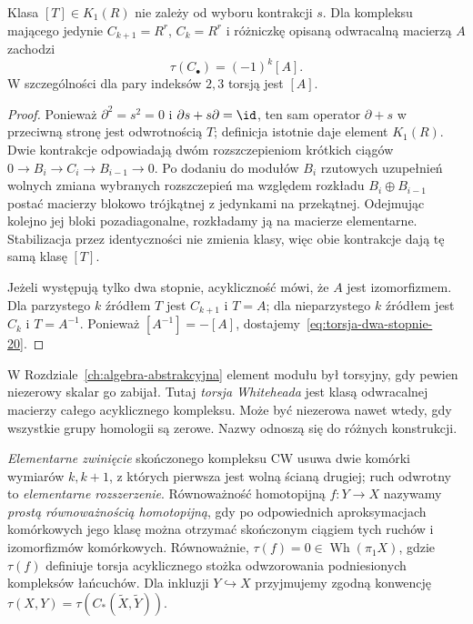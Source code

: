 \begin{stwierdzenie}
\label{prop:torsja-poprawna-20}
Klasa $[T]\in K_1(R)$ nie zależy od wyboru
kontrakcji $s$. Dla kompleksu mającego jedynie
$C_{k+1}=R^r$, $C_k=R^r$ i różniczkę opisaną
odwracalną macierzą $A$ zachodzi
\begin{equation}\label{eq:torsja-dwa-stopnie-20}
 \tau(C_\bullet)=(-1)^k[A].
\end{equation}
W szczególności dla pary indeksów $2,3$ torsją
jest $[A]$.
\end{stwierdzenie}
\begin{proof}
Ponieważ $\partial^2=s^2=0$ i
$\partial s+s\partial=\id$, ten sam operator
$\partial+s$ w przeciwną stronę jest odwrotnością
$T$; definicja istotnie daje element $K_1(R)$.
Dwie kontrakcje odpowiadają dwóm rozszczepieniom
krótkich ciągów $0\to B_i\to C_i\to B_{i-1}\to0$.
Po dodaniu do modułów $B_i$ rzutowych
uzupełnień wolnych zmiana wybranych rozszczepień
ma względem rozkładu $B_i\oplus B_{i-1}$ postać
macierzy blokowo trójkątnej z jedynkami na przekątnej.
Odejmując kolejno jej bloki pozadiagonalne,
rozkładamy ją na macierze elementarne.
Stabilizacja przez identyczności nie zmienia klasy,
więc obie kontrakcje dają tę samą klasę $[T]$.

Jeżeli występują tylko dwa stopnie, acykliczność
mówi, że $A$ jest izomorfizmem. Dla parzystego $k$
źródłem $T$ jest $C_{k+1}$ i $T=A$; dla nieparzystego
$k$ źródłem jest $C_k$ i $T=A^{-1}$.
Ponieważ $[A^{-1}]=-[A]$, dostajemy~\eqref{eq:torsja-dwa-stopnie-20}.
\end{proof}

\begin{uwaga}
W Rozdziale~\ref{ch:algebra-abstrakcyjna} element
modułu był torsyjny, gdy pewien niezerowy skalar go
zabijał. Tutaj \emph{torsja Whiteheada} jest klasą
odwracalnej macierzy całego acyklicznego kompleksu.
Może być niezerowa nawet wtedy, gdy wszystkie grupy
homologii są zerowe. Nazwy odnoszą się do różnych
konstrukcji.
\end{uwaga}

\begin{definicja}
\label{def:prosta-homotopia-20}
\emph{Elementarne zwinięcie} skończonego kompleksu CW
usuwa dwie komórki wymiarów $k,k+1$, z których
pierwsza jest wolną ścianą drugiej; ruch odwrotny
to \emph{elementarne rozszerzenie}. Równoważność
homotopijną $f:Y\to X$ nazywamy
\emph{prostą równoważnością homotopijną}, gdy
po odpowiednich aproksymacjach komórkowych jego
klasę można otrzymać skończonym ciągiem tych
ruchów i izomorfizmów komórkowych. Równoważnie,
$\tau(f)=0\in\operatorname{Wh}(\pi_1X)$, gdzie
$\tau(f)$ definiuje torsja acyklicznego stożka
odwzorowania podniesionych kompleksów łańcuchów.
Dla inkluzji $Y\hookrightarrow X$ przyjmujemy
zgodną konwencję $\tau(X,Y)=\tau(C_*(\widetilde X,
\widetilde Y))$.
\end{definicja}

